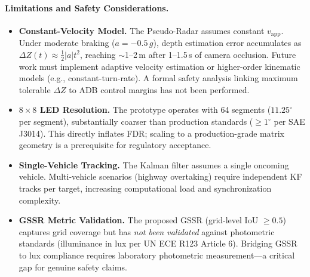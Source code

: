 \documentclass[pdflatex,sn-mathphys-num]{sn-jnl}%
\theoremstyle{thmstyleone}%
\theoremstyle{thmstyletwo}%
\theoremstyle{thmstylethree}%
\begin{document}
\paragraph{Limitations and Safety Considerations.}
\begin{itemize}[leftmargin=*]
  \item \textbf{Constant-Velocity Model.} The Pseudo-Radar assumes
    constant $v_{\mathrm{app}}$. Under moderate braking
    ($a = -0.5\,g$), depth estimation error accumulates as
    $\Delta Z(t) \approx \frac{1}{2}|a|t^2$, reaching ${\sim}$1--2\,m
    after 1--1.5\,s of camera occlusion. Future work must implement
    adaptive velocity estimation or higher-order kinematic models
    (e.g., constant-turn-rate). A formal safety analysis linking
    maximum tolerable $\Delta Z$ to ADB control margins has not been
    performed.
  \item \textbf{$8\times8$ LED Resolution.} The prototype operates
    with 64 segments ($11.25^\circ$ per segment), substantially coarser
    than production standards ($\geq1^\circ$ per SAE J3014). This directly
    inflates FDR; scaling to a production-grade matrix geometry is a
    prerequisite for regulatory acceptance.
  \item \textbf{Single-Vehicle Tracking.} The Kalman filter assumes
    a single oncoming vehicle. Multi-vehicle scenarios (highway
    overtaking) require independent KF tracks per target, increasing
    computational load and synchronization complexity.
  \item \textbf{GSSR Metric Validation.} The proposed GSSR (grid-level
    IoU $\geq 0.5$) captures grid coverage but has \emph{not been
    validated} against photometric standards (illuminance in lux per
    UN ECE R123 Article 6). Bridging GSSR to lux compliance requires
    laboratory photometric measurement---a critical gap for genuine
    safety claims.
\end{itemize}
\end{document}
